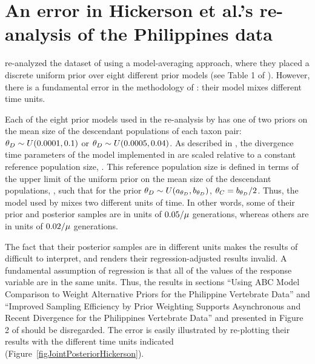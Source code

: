 \section*{An error in Hickerson et al.'s re-analysis of the Philippines data}
\citet{Hickerson2013} re-analyzed the dataset of \citet{Oaks2012} using a
model-averaging approach, where they placed a discrete uniform prior over eight
different prior models (see Table 1 of \citet{Hickerson2013}).
However, there is a fundamental error in the methodology of
\citet{Hickerson2013}: their model mixes different time units.

Each of the eight prior models used in the re-analysis by \citet{Hickerson2013}
has one of two priors on the mean size of the descendant populations of each
taxon pair:
$\meanDescendantTheta{} \sim U(0.0001, 0.1)$ or
$\meanDescendantTheta{} \sim U(0.0005, 0.04)$.
As described in \citet{Oaks2012}, the divergence time parameters of the model
implemented in \msb are scaled relative to a constant reference population
size, .
This reference population size is defined in terms of the upper limit of the
uniform prior on the mean size of the descendant populations,
\meanDescendantTheta{}, such that for the prior $\meanDescendantTheta{} \sim
U(\uniformMin{\meanDescendantTheta{}},\uniformMax{\meanDescendantTheta{}})$,
$\myTheta{C} = \uniformMax{\meanDescendantTheta{}}/2$.
Thus, the model used by \citet{Hickerson2013} mixes two different units of
time.
In other words, some of their prior and posterior samples are in units of
$0.05/\mu$ generations, whereas others are in units of
$0.02/\mu$ generations.

The fact that their posterior samples are in different units makes the results
of \citet{Hickerson2013} difficult to interpret, and renders their
regression-adjusted results invalid.
A fundamental assumption of regression is that all of the values of the
response variable are in the same units.
Thus, the results in sections ``Using ABC Model Comparison to Weight
Alternative Priors for the Philippine Vertebrate Data'' and ``Improved Sampling
Efficiency by Prior Weighting Supports Asynchronous and Recent Divergence for
the Philippines Vertebrate Data'' and presented in Figure 2 of
\citet{Hickerson2013} should be disregarded.
The error is easily illustrated by re-plotting their results with the different
time units indicated (Figure~\ref{figJointPosteriorHickerson}).

